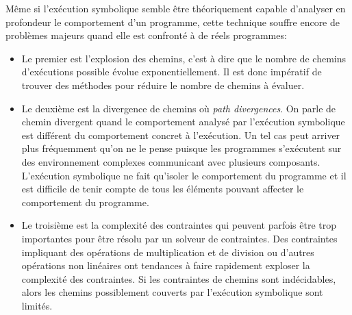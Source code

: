 Même si l'exécution symbolique semble être théoriquement capable d'analyser en profondeur le comportement d'un programme, cette technique souffre encore de problèmes majeurs quand elle est confronté à de réels programmes:\\
\begin{itemize}
\item Le premier est l'explosion des chemins, c'est à dire que le nombre de chemins d'exécutions possible évolue exponentiellement. Il est donc impératif de trouver des méthodes pour réduire le nombre de chemins à évaluer.\\
\item Le deuxième est la divergence de chemins où \textit{path divergences}. On parle de chemin divergent quand le comportement analysé par l'exécution symbolique est différent du comportement concret à l'exécution. Un tel cas peut arriver plus fréquemment qu'on ne le pense puisque les programmes s'exécutent sur des environnement complexes communicant avec plusieurs composants. L'exécution symbolique ne fait qu'isoler le comportement du programme et il est difficile de tenir compte de tous les éléments pouvant affecter le comportement du programme.\\
\item Le troisième est la complexité des contraintes qui peuvent parfois être trop importantes pour être résolu par un solveur de contraintes. Des contraintes impliquant des opérations de multiplication et de division ou d'autres opérations non linéaires ont tendances à faire rapidement exploser la complexité des contraintes. Si les contraintes de chemins sont indécidables, alors les chemins possiblement couverts par l'exécution symbolique sont limités.

\end{itemize}

